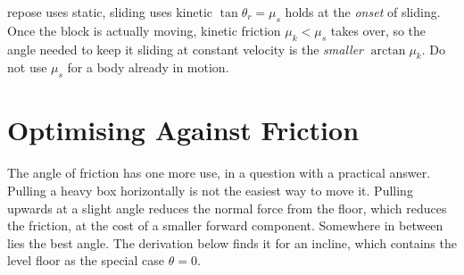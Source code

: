 \begin{trapbox}{repose uses static, sliding uses kinetic}
$\tan\theta_r=\mu_s$ holds at the \emph{onset} of sliding. Once the block is actually moving, kinetic
friction $\mu_k<\mu_s$ takes over, so the angle needed to keep it sliding at constant velocity is the
\emph{smaller} $\arctan\mu_k$. Do not use $\mu_s$ for a body already in motion.
\end{trapbox}

\section{Optimising Against Friction}

The angle of friction has one more use, in a question with a practical answer. Pulling a heavy box
horizontally is not the easiest way to move it. Pulling upwards at a slight angle
reduces the normal force from the floor, which reduces the friction, at the cost of a smaller forward
component. Somewhere in between lies the best angle. The derivation below finds it for an incline, which
contains the level floor as the special case $\theta=0$.

